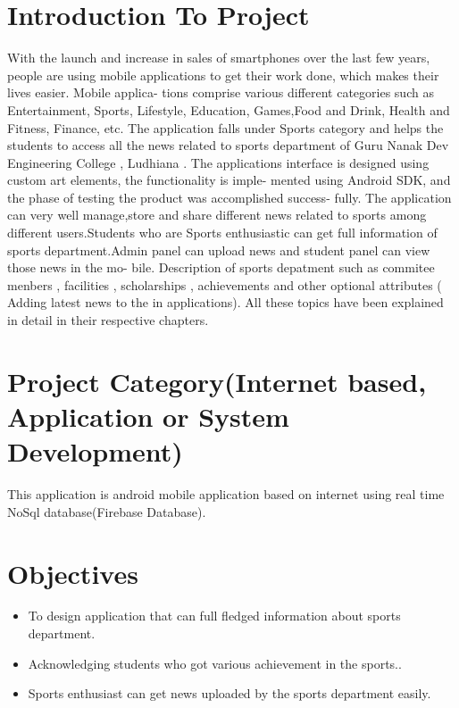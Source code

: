 \section{Introduction To Project} 
With the launch and increase in sales of smartphones over the last few years, people are using
mobile applications to get their work done, which makes their lives easier. Mobile applica-
tions comprise various different categories such as Entertainment, Sports, Lifestyle, Education,
Games,Food and Drink, Health and Fitness, Finance, etc. The application falls under Sports
category and helps the students to access all the news related to sports department of Guru
Nanak Dev Engineering College , Ludhiana .
The applications interface is designed using custom art elements, the functionality is imple-
mented using Android SDK, and the phase of testing the product was accomplished success-
fully. The application can very well manage,store and share different news related to sports
among different users.Students who are Sports enthusiastic can get full information of sports
department.Admin panel can upload news and student panel can view those news in the mo-
bile. Description of sports depatment such as commitee menbers , facilities , scholarships ,
achievements and other optional attributes ( Adding latest news to the in applications). All
these topics have been explained in detail in their respective chapters.

\section{Project Category(Internet based, Application or System Development)}
This application is android mobile application based on internet using real time NoSql database(Firebase Database).

\section{Objectives}

\begin{itemize}
	\item  To design application that can full fledged information about sports department.

	\item Acknowledging students who got various achievement in the sports..
	
	\item Sports enthusiast can get news uploaded by the sports department easily.


\end{itemize}

